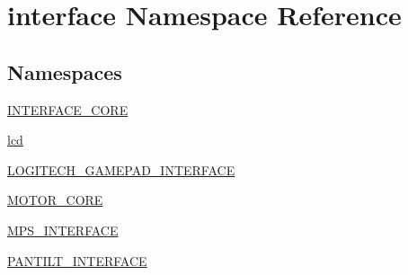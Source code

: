 \hypertarget{namespaceinterface}{}\section{interface Namespace Reference}
\label{namespaceinterface}
\subsection*{Namespaces}
\begin{DoxyCompactItemize}
\item 
 \hyperlink{namespaceinterface_1_1INTERFACE__CORE}{I\+N\+T\+E\+R\+F\+A\+C\+E\+\_\+\+C\+O\+R\+E}
\item 
 \hyperlink{namespaceinterface_1_1lcd}{lcd}
\item 
 \hyperlink{namespaceinterface_1_1LOGITECH__GAMEPAD__INTERFACE}{L\+O\+G\+I\+T\+E\+C\+H\+\_\+\+G\+A\+M\+E\+P\+A\+D\+\_\+\+I\+N\+T\+E\+R\+F\+A\+C\+E}
\item 
 \hyperlink{namespaceinterface_1_1MOTOR__CORE}{M\+O\+T\+O\+R\+\_\+\+C\+O\+R\+E}
\item 
 \hyperlink{namespaceinterface_1_1MPS__INTERFACE}{M\+P\+S\+\_\+\+I\+N\+T\+E\+R\+F\+A\+C\+E}
\item 
 \hyperlink{namespaceinterface_1_1PANTILT__INTERFACE}{P\+A\+N\+T\+I\+L\+T\+\_\+\+I\+N\+T\+E\+R\+F\+A\+C\+E}
\end{DoxyCompactItemize}

